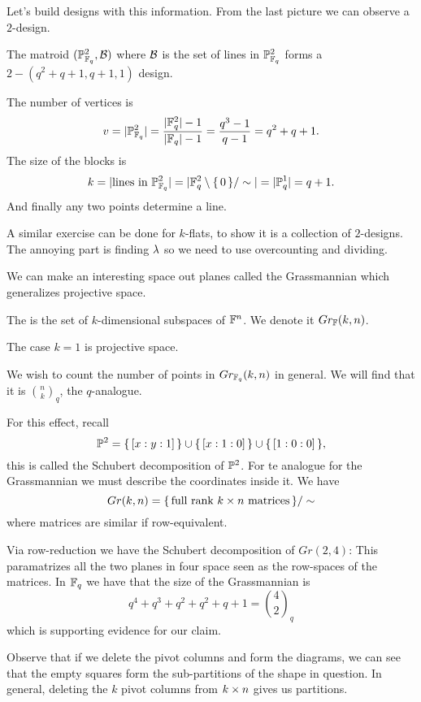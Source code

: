 \documentclass[12pt]{memoir}
\begin{document}
Let's build designs with this information. From the last picture we can observe a $2$-design.

\begin{Lem}
The matroid $(\mathbb{P}_{\mathbb{F}_q}^2,\mathcal{B})$ where $\mathcal{B}$ is the set of lines in $\mathbb{P}^2_{\mathbb{F}_q}$ forms a $2-(q^2+q+1,q+1,1)$ design.
\end{Lem}

\begin{ptcbp}
    The number of vertices is 
    $$v=|\mathbb{P}^2_{\mathbb{F}_q}|=\frac{|\mathbb{F}_q^2|-1}{|\mathbb{F}_q|-1}=\frac{q^3-1}{q-1}=q^2+q+1.$$
    The size of the blocks is 
    $$k=|\text{lines in }\mathbb{P}^2_{\mathbb{F}_q}|=|\mathbb{F}_q^2\setminus\{\,0\,\}/\sim|=|\mathbb{P}^1_q|=q+1.$$
    And finally any two points determine a line.
\end{ptcbp}

A similar exercise can be done for $k$-flats, to show it is a collection of $2$-designs. The annoying part is finding $\lambda$ so we need to use overcounting and dividing.\par 
We can make an interesting space out planes called the Grassmannian which generalizes projective space.

\begin{Def}
    The  is the set of $k$-dimensional subspaces of $\mathbb{F}^n$. We denote it $Gr_{\mathbb{F}}(k,n)$.
\end{Def}

\begin{Ex}
The case $k=1$ is projective space.    
\end{Ex}

We wish to count the number of points in $Gr_{\mathbb{F}_q}(k,n)$ in general. We will find that it is $\binom{n}{k}_q$, the $q$-analogue.\par 
For this effect, recall 
$$\mathbb{P}^2=\{\,[x:y:1]\,\}\cup\{\,[x:1:0]\,\}\cup\{\,[1:0:0]\,\},$$
this is called the Schubert decomposition of $\mathbb{P}^2$. For te analogue for the Grassmannian we must describe the coordinates inside it. We have 
$$Gr(k,n)=\{\,\text{full rank }k\times n\text{ matrices}\,\}/\sim$$
where matrices are similar if row-equivalent.

\begin{Ex}
    Via row-reduction we have the Schubert decomposition of $Gr(2,4)$:
    This paramatrizes all the two planes in four space seen as the row-spaces of the matrices. In $\mathbb{F}_q$ we have that the size of the Grassmannian is 
    $$q^4+q^3+q^2+q^2+q+1=\binom{4}{2}_q$$
    which is supporting evidence for our claim.\par 
    Observe that if we delete the pivot columns and form the diagrams, we can see that the empty squares form the sub-partitions of the shape in question. In general, deleting the $k$ pivot columns from $k\times n$ gives us partitions.
\end{Ex}
\end{document}
